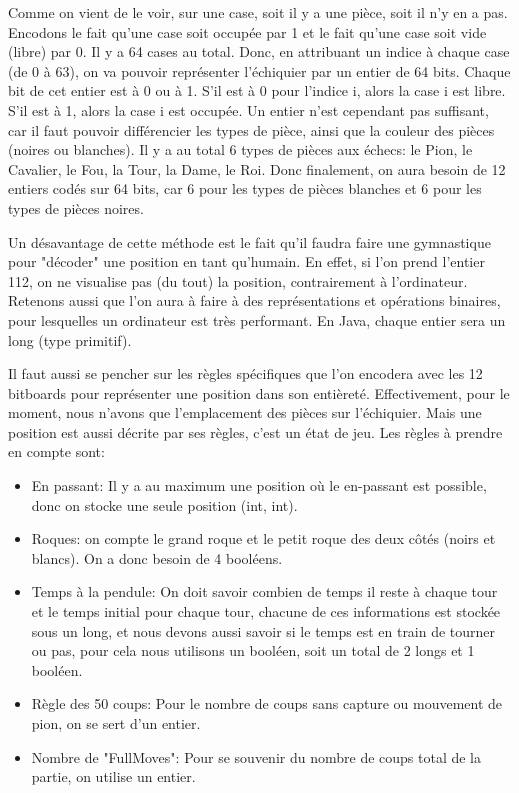\documentclass{article}
\begin{document}
Comme on vient de le voir, sur une case, soit il y a une pièce, soit il n'y en a pas.
Encodons le fait qu'une case soit occupée par 1 et le fait qu'une case soit vide (libre) par 0. Il y a 64 cases au total.
Donc, en attribuant un indice à chaque case (de 0 à 63), on va pouvoir représenter l'échiquier par un entier de 64 bits.
Chaque bit de cet entier est à 0 ou à 1. S'il est à 0 pour l'indice i, alors la case i est libre. S'il est à 1, alors la
case i est occupée. Un entier n'est cependant pas suffisant, car il faut pouvoir différencier les types de pièce, ainsi
que la couleur des pièces (noires ou blanches). Il y a au total 6 types de pièces aux échecs: le Pion, le Cavalier, le Fou,
la Tour, la Dame, le Roi. Donc finalement, on aura besoin de 12 entiers codés sur 64 bits, car 6 pour les types de pièces
blanches et 6 pour les types de pièces noires.

Un désavantage de cette méthode
est le fait qu'il faudra faire une gymnastique pour "décoder" une position en tant qu'humain. En effet, si l'on prend l'entier
112, on ne visualise pas (du tout) la position, contrairement à l'ordinateur.
Retenons aussi que l'on aura à faire à des représentations et opérations binaires, pour lesquelles un ordinateur est très
performant. En Java, chaque entier sera un long (type primitif).

Il faut aussi se pencher sur les règles spécifiques que l'on encodera avec les 12 bitboards pour représenter une position
dans son entièreté. Effectivement, pour le moment, nous n'avons que l'emplacement des pièces sur l'échiquier. Mais une position
est aussi décrite par ses règles, c'est un état de jeu. Les règles à prendre en compte sont:\\
\begin{itemize}
   \item En passant: Il y a au maximum une position où le en-passant est possible, donc on stocke une seule position (int, int).
    \item Roques: on compte le grand roque et le petit roque des deux côtés (noirs et blancs). On a donc besoin de 4 booléens.
   \item Temps à la pendule: On doit savoir combien de temps il reste à chaque tour et le temps initial pour chaque tour, chacune de ces informations est stockée sous un long, et nous devons aussi savoir si le temps est en train de tourner ou pas, pour cela nous utilisons un booléen, soit un total de 2 longs et 1 booléen.
   \item Règle des 50 coups: Pour le nombre de coups sans capture ou mouvement de pion, on se sert d’un entier.
   \item Nombre de "FullMoves": Pour se souvenir du nombre de coups total de la partie, on utilise un entier.\\
\end{itemize}
\end{document}

